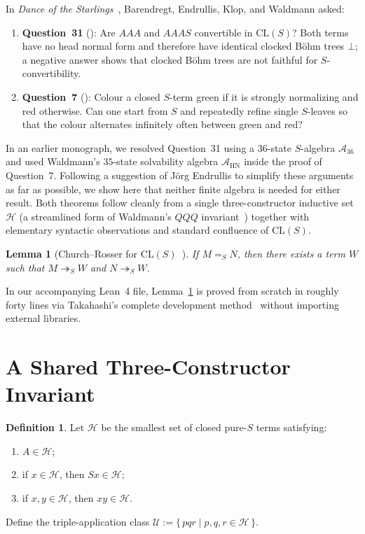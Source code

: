 \documentclass[11pt,reqno]{amsart}
\newtheorem{lemma}[theorem]{Lemma}
\theoremstyle{definition}
\newtheorem{definition}[theorem]{Definition}
\theoremstyle{remark}
\newcommand{\CLS}{\mathrm{CL}(S)}
\newcommand{\redS}{\twoheadrightarrow_S}
\newcommand{\convS}{=_S}
\begin{document}
In \emph{Dance of the Starlings}~\cite{BarendregtEndrullisKlopWaldmann2017}, Barendregt, Endrullis, Klop, and Waldmann asked:
\begin{enumerate}
  \item \textbf{Question~31} (\cite[p.~93]{BarendregtEndrullisKlopWaldmann2017}): Are $A A A$ and $A A A S$ convertible in $\CLS$? Both terms have no head normal form and therefore have identical clocked B\"ohm trees $\bot$; a negative answer shows that clocked B\"ohm trees are not faithful for $S$-convertibility.
  \item \textbf{Question~7} (\cite[p.~81]{BarendregtEndrullisKlopWaldmann2017}): Colour a closed $S$-term green if it is strongly normalizing and red otherwise. Can one start from $S$ and repeatedly refine single $S$-leaves so that the colour alternates infinitely often between green and red?
\end{enumerate}

In an earlier monograph, we resolved Question~31 using a $36$-state $S$-algebra $\mathcal{A}_{36}$ and used Waldmann's $35$-state solvability algebra $\mathcal{A}_{\mathrm{HN}}$ inside the proof of Question~7. Following a suggestion of J\"org Endrullis to simplify these arguments as far as possible, we show here that neither finite algebra is needed for either result. Both theorems follow cleanly from a single three-constructor inductive set $\mathcal{H}$ (a streamlined form of Waldmann's $QQQ$ invariant~\cite{Waldmann2000}) together with elementary syntactic observations and standard confluence of $\CLS$.

\begin{lemma}[Church--Rosser for $\CLS$~\cite{Takahashi1995}]\label{lem:cr}
If $M \convS N$, then there exists a term $W$ such that $M \redS W$ and $N \redS W$.
\end{lemma}

In our accompanying Lean~4 file, Lemma~\ref{lem:cr} is proved from scratch in roughly forty lines via Takahashi's complete development method~\cite{Takahashi1995} without importing external libraries.

\section{A Shared Three-Constructor Invariant}\label{sec:invariant}

\begin{definition}\label{def:heavy}
Let $\mathcal{H}$ be the smallest set of closed pure-$S$ terms satisfying:
\begin{enumerate}
  \item[(H1)] $A \in \mathcal{H}$;
  \item[(H2)] if $x \in \mathcal{H}$, then $S x \in \mathcal{H}$;
  \item[(H3)] if $x, y \in \mathcal{H}$, then $x y \in \mathcal{H}$.
\end{enumerate}
Define the triple-application class $\mathcal{U} := \{\, p q r \mid p, q, r \in \mathcal{H} \,\}$.
\end{definition}
\end{document}
